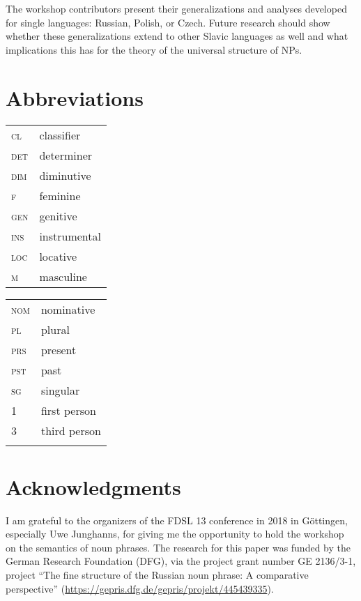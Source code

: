 \documentclass[output=paper,
colorlinks,
citecolor=brown,
newtxmath
]{langscibook}
\begin{document}
The workshop contributors present their generalizations and analyses developed for single languages: Russian, Polish, or Czech. Future research should show whether these generalizations extend to other Slavic languages as well and what implications this has for the theory of the universal structure of NPs.

\section*{Abbreviations}

\begin{tabularx}{.5\textwidth}{@{}lX@{}}
\textsc{cl}&{classifier}\\
\textsc{det}&{determiner}\\
\textsc{dim}&{diminutive}\\
\textsc{f}&{feminine}\\
\textsc{gen}&{genitive}\\
\textsc{ins}&{instrumental}\\
\textsc{loc}&{locative}\\
\textsc{m}&{masculine}\\
\end{tabularx}%
\begin{tabularx}{.5\textwidth}{@{}lX@{}}
\textsc{nom}&{nominative}\\
\textsc{pl}&{plural}\\
\textsc{prs}&{present}\\
\textsc{pst}&{past}\\
\textsc{sg}&{singular}\\
\textsc{1}&{first person}\\
\textsc{3}&{third person}\\
&\\
\end{tabularx}

\section*{Acknowledgments}
I am grateful to the organizers of the FDSL 13 conference in 2018 in Göttingen, especially Uwe Junghanns, for giving me the opportunity to hold the workshop on the semantics of noun phrases. The research for this paper was funded by the German Research Foundation (DFG), via the project grant number GE 2136/3-1, project ``The fine structure of the Russian noun phrase: A comparative perspective'' (\url{https://gepris.dfg.de/gepris/projekt/445439335}).

\sloppy
\printbibliography[heading=subbibliography,notkeyword=this]
\end{document}
